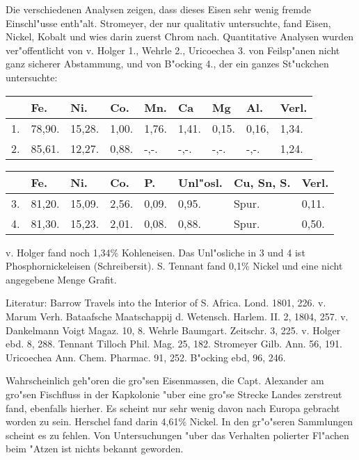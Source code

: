\documentclass[a4paper, 11pt, oneside]{article}
\begin{document}
Die verschiedenen Analysen zeigen, dass dieses Eisen sehr wenig fremde Einschl"usse enth"alt. Stromeyer, der nur qualitativ untersuchte, fand Eisen, Nickel, Kobalt und wies darin zuerst Chrom nach. Quantitative Analysen wurden ver"offentlicht von v. Holger 1., Wehrle 2., Uricoechea 3. von Feilsp"anen nicht ganz sicherer Abstammung, und von B"ocking 4., der ein ganzes St"uckchen untersuchte:
\begin{table}[H]
    \centering
    \begin{tabular}{l l l l l l l l l}
         & Fe. & Ni. & Co. & Mn. & Ca & Mg & Al. & Verl. \\ \hline
        1. & 78,90. & 15,28. & 1,00. & 1,76. & 1,41. & 0,15. & 0,16, & 1,34. \\
        2. & 85,61. & 12,27. & 0,88. & -,-. & -,-. & -,-. & -,-. & 1,24. \\
    \end{tabular}
\end{table}

\begin{table}[H]
    \centering
    \begin{tabular}{l l l l l l l l}
         & Fe. & Ni. & Co. & P. & Unl"osl. & Cu, Sn, S. & Verl. \\ \hline
        3. & 81,20. & 15,09. & 2,56. & 0,09. & 0,95. & Spur. & 0,11. \\
        4. & 81,30. & 15,23. & 2,01. & 0,08. & 0,88. & Spur. & 0,50. \\
    \end{tabular}
\end{table}

v. Holger fand noch 1,34\% Kohleneisen. Das Unl"osliche in 3 und 4 ist Phosphornickeleisen (Schreibersit). S. Tennant fand 0,1\% Nickel und eine nicht angegebene Menge Grafit.

\footnotesize
Literatur: Barrow Travels into the Interior of S. Africa. Lond. 1801, 226. v. Marum Verh. Bataafsche Maatschappij d. Wetensch. Harlem. II. 2, 1804, 257. v. Dankelmann Voigt Magaz. 10, 8. Wehrle Baumgart. Zeitschr. 3, 225. v. Holger ebd. 8, 288. Tennant Tilloch Phil. Mag. 25, 182. Stromeyer Gilb. Ann. 56, 191. Uricoechea Ann. Chem. Pharmac. 91, 252. B"ocking ebd, 96, 246.

\normalsize
Wahrscheinlich geh"oren die gro"sen Eisenmassen, die Capt. Alexander am gro"sen Fischfluss in der Kapkolonie "uber eine gro"se Strecke Landes zerstreut fand, ebenfalls hierher. Es scheint nur sehr wenig davon nach Europa gebracht worden zu sein. Herschel fand darin 4,61\% Nickel. In den gr"o"seren Sammlungen scheint es zu fehlen. Von Untersuchungen "uber das Verhalten polierter Fl"achen beim "Atzen ist nichts bekannt geworden.
\end{document}
